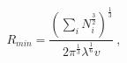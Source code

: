 \begin{equation}
R_{min}=\frac{\left(\sum_iN_i^{\frac{3}{2}}\right)^{\frac{1}{3}}}{2\pi^{\frac{1}{3}}\lambda^{\frac{1}{6}}v}~,
\label{R.eqn2}
\end{equation}

